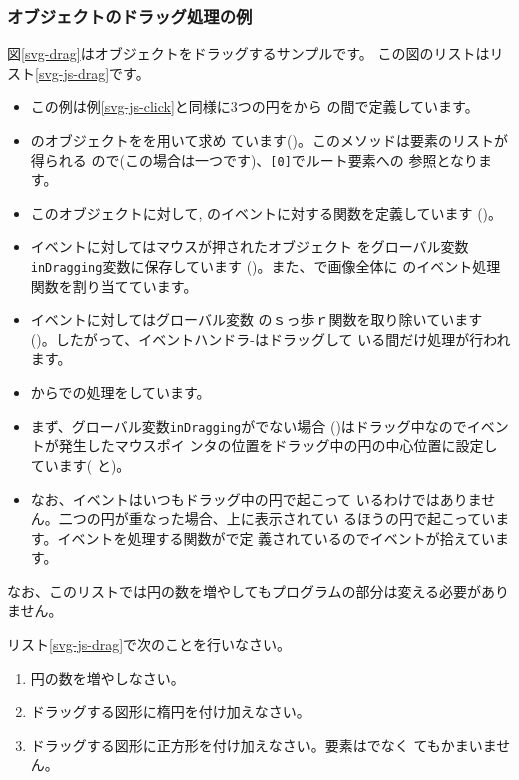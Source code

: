 \subsubsection{オブジェクトのドラッグ処理の例}
図\ref{svg-drag}はオブジェクトをドラッグするサンプルです。
この図のリストはリスト\ref{svg-js-drag}です。
%
\newpage
{}
\begin{itemize}
 \item この例は例\ref{svg-js-click}と同様に3つの円をから
       の間で定義しています。
 \item {}のオブジェクトをを用いて求め
       ています()。このメソッドは要素のリストが得られる
       ので(この場合は一つです)、\texttt{[0]}でルート要素への
       参照となります。
 \item このオブジェクトに対して, %
        のイベントに対する関数を定義しています%
       ()。
 \item {}イベントに対してはマウスが押されたオブジェクト
       をグローバル変数\texttt{inDragging}変数に保存しています
       ()。また、で画像全体に
       のイベント処理関数を割り当てています。
 \item {}イベントに対してはグローバル変数
       のｓっ歩ｒ関数を取り除いています
       ()。したがって、イベントハンドラ-はドラッグして
       いる間だけ処理が行われます。
 \item {}からでの処理をしています。
 \item まず、グローバル変数\texttt{inDragging}がでない場合
       ()はドラッグ中なのでイベントが発生したマウスポイ
       ンタの位置をドラッグ中の円の中心位置に設定しています(
       と)。
 \item なお、イベントはいつもドラッグ中の円で起こって
       いるわけではありません。二つの円が重なった場合、上に表示されてい
       るほうの円で起こっています。イベントを処理する関数がで定
       義されているのでイベントが拾えています。
\end{itemize}
なお、このリストでは円の数を増やしてもプログラムの部分は変える必要があり
ません。
\begin{Problem}\upshape\label{check-drag-prob}
 リスト\ref{svg-js-drag}で次のことを行いなさい。
\begin{enumerate}
 \item 円の数を増やしなさい。
 \item ドラッグする図形に楕円を付け加えなさい。
 \item ドラッグする図形に正方形を付け加えなさい。要素はでなく
       てもかまいません。
 \end{enumerate}
\end{Problem}

